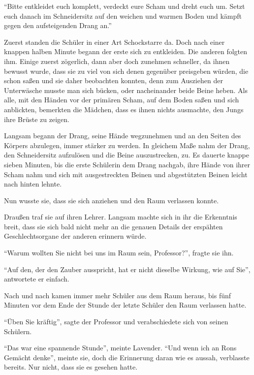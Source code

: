 \enquote{Bitte entkleidet euch komplett, verdeckt eure Scham und dreht euch um. Setzt euch danach im Schneidersitz auf den weichen und warmen Boden und kämpft gegen den aufsteigenden Drang an.}

Zuerst standen die Schüler in einer Art Schockstarre da. Doch nach einer knappen halben Minute begann der erste sich zu entkleiden. Die anderen folgten ihm. Einige zuerst zögerlich, dann aber doch zunehmen schneller, da ihnen bewusst wurde, dass sie zu viel von sich denen gegenüber preisgeben würden, die schon saßen und sie daher beobachten konnten, denn zum Ausziehen der Unterwäsche musste man sich bücken, oder nacheinander beide Beine heben. Als alle, mit den Händen vor der primären Scham, auf dem Boden saßen und sich anblickten, bemerkten die Mädchen, dass es ihnen nichts ausmachte, den Jungs ihre Brüste zu zeigen.

Langsam begann der Drang, seine Hände wegzunehmen und an den Seiten des Körpers abzulegen, immer stärker zu werden. In gleichem Maße nahm der Drang, den Schneidersitz aufzulösen und die Beine auszustrecken, zu. Es dauerte knappe sieben Minuten, bis die erste Schülerin dem Drang nachgab, ihre Hände von ihrer Scham nahm und sich mit ausgestreckten Beinen und abgestützten Beinen leicht nach hinten lehnte.

Nun wusste sie, dass sie sich anziehen und den Raum verlassen konnte.

Draußen traf sie auf ihren Lehrer. Langsam machte sich in ihr die Erkenntnis breit, dass sie sich bald nicht mehr an die genauen Details der erspähten Geschlechtsorgane der anderen erinnern würde.

\enquote{Warum wollten Sie nicht bei uns im Raum sein, Professor?}, fragte sie ihn.

\enquote{Auf den, der den Zauber ausspricht, hat er nicht dieselbe Wirkung, wie auf Sie}, antwortete er einfach.

Nach und nach kamen immer mehr Schüler aus dem Raum heraus, bis fünf Minuten vor dem Ende der Stunde der letzte Schüler den Raum verlassen hatte.

\enquote{Üben Sie kräftig}, sagte der Professor und verabschiedete sich von seinen Schülern.

\enquote{Das war eine spannende Stunde}, meinte Lavender. \enquote{Und wenn ich an Rons Gemächt denke\abs}, meinte sie, doch die Erinnerung daran wie es aussah, verblasste bereits. Nur nicht, dass sie es gesehen hatte.

